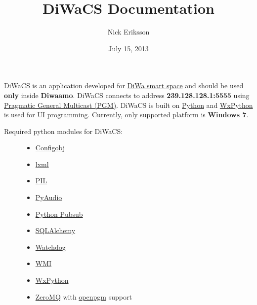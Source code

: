 \documentclass[letterpaper,10pt,english]{sphinxmanual}
\title{DiWaCS Documentation}
\date{July 15, 2013}
\author{Nick Eriksson}
\begin{document}
\maketitle
\tableofcontents
{}\label{index::doc}


DiWaCS is an application developed for \href{https://cse.aalto.fi/research/groups/stratus/research/research-projects/}{DiWa smart space}
and should be used \textbf{only} inside \textbf{Diwaamo}.
DiWaCS connects to address \textbf{239.128.128.1:5555} using \href{http://code.google.com/p/openpgm/}{Pragmatic General Multicast (PGM)}.
DiWaCS is built on \href{http://www.python.org}{Python} and \href{http://www.wxpython.org}{WxPython} is used for UI programming.
Currently, only supported platform is \textbf{Windows 7}.
\begin{description}
\item[{Required python modules for DiWaCS:}] \leavevmode\begin{itemize}
\item {} 
\href{http://www.voidspace.org.uk/python/configobj.html}{Configobj}

\item {} 
\href{http://pypi.python.org/pypi/lxml/}{lxml}

\item {} 
\href{http://www.pythonware.com/products/pil/}{PIL}

\item {} 
\href{http://pypi.python.org/pypi/PyAudio}{PyAudio}

\item {} 
\href{http://pubsub.sourceforge.net/}{Python Pubsub}

\item {} 
\href{http://www.sqlalchemy.org/}{SQLAlchemy}

\item {} 
\href{http://packages.python.org/watchdog/}{Watchdog}

\item {} 
\href{http://pypi.python.org/pypi/WMI/1.4.9/}{WMI}

\item {} 
\href{http://www.wxpython.org}{WxPython}

\item {} 
\href{http://zeromq.org}{ZeroMQ} with \href{http://code.google.com/p/openpgm/}{openpgm} support

\end{itemize}

\end{description}
\end{document}
